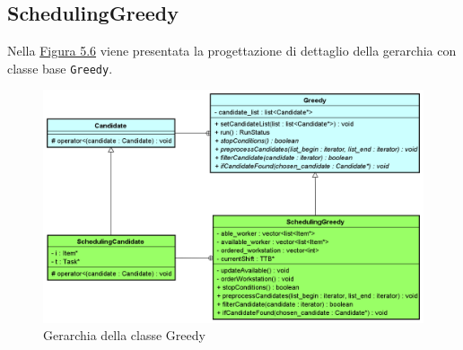 \subsection{SchedulingGreedy}
Nella \hyperref[fig56]{Figura 5.6} viene presentata la progettazione di dettaglio della gerarchia con classe base \texttt{Greedy}.
\begin{figure}[!h]
    \label{fig56}
    \begin{widepage}
        \centering
        \includegraphics[width=15.5cm,keepaspectratio]{../immagini/progettazione/greedy.png}
        \caption{Gerarchia della classe Greedy}
    \end{widepage}
\end{figure}
\FloatBarrier
\noindent
